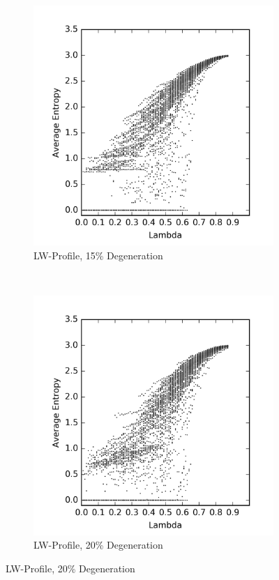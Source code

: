 \documentclass[a4paper,11pt]{report}
\begin{document}
\begin{figure}[htp]
\begin{subfigure}[t]{0.4\textwidth}
  \centering
  \includegraphics[width=\textwidth]{ch6_figs/degen_stoma_15}
  \caption{LW-Profile, 15\% Degeneration}
  \label{fig:lw_degen_pt_15}
  \end{subfigure}
~
\begin{subfigure}[t]{0.4\textwidth}
  \centering
  \includegraphics[width=\textwidth]{ch6_figs/degen_stoma_20}
  \caption{LW-Profile, 20\% Degeneration}
  \label{fig:lw_degen_pt_20}
  \end{subfigure}


\end{figure}
\end{document}

